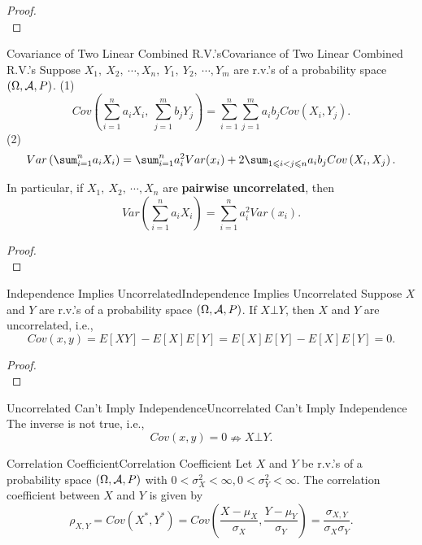 \documentclass{elegantbook}
\begin{document}
\begin{proof}
\\[4cm]\vspace{0.01cm}
\end{proof}

\begin{theorem}{Covariance of Two Linear Combined R.V.'s}{Covariance of Two Linear Combined R.V.'s}
Suppose \(X_{1},\ X_{2},\ \cdots,X_{n},\ Y_{1},\ Y_{2},\ \cdots,Y_{m}\)
are r.v.'s of a probability space $(\Omega,\mathcal{A}, P)$.
(1)
\[Cov\left( \sum_{i = 1}^{n}{a_{i}X_{i}},\ \sum_{j = 1}^{m}{b_{j}Y_{j}} \right) = \sum_{i = 1}^{n}{\sum_{j = 1}^{m}a_{i}b_{j}}Cov\left( X_{i},Y_{j} \right).\]
(2)
\[Var\left( \sum_{i = 1}^{n}{a_{i}X_{i}} \right) = \sum_{i = 1}^{n}{a_{i}^{2}Var(x_{i})} + 2\sum_{1 \ls i < j \ls n}^{}a_{i}b_{j}Cov\left( X_{i},X_{j} \right).\]

In particular, if \(X_{1},\ X_{2},\ \cdots,X_{n}\) are \textbf{pairwise
uncorrelated}, then
\[Var\left( \sum_{i = 1}^{n}{a_{i}X_{i}} \right) = \sum_{i = 1}^{n}{a_{i}^{2}Var(x_{i})}.\]
\end{theorem}

\begin{proof}
\\[4cm]\vspace{0.01cm}
\end{proof}

\begin{theorem}{Independence Implies Uncorrelated}{Independence Implies Uncorrelated}
Suppose \(X\) and \(Y\) are r.v.'s of a probability space $(\Omega,\mathcal{A}, P)$. If \(X\bot Y\), then \(X\) and \(Y\) are uncorrelated, i.e.,
\[Cov(x,y) = E[XY] - E[X] E[Y] = E[X] E[Y] - E[X] E[Y] = 0.\]
\vspace{0.01cm}
\end{theorem}

\begin{proof}
\\[4cm]\vspace{0.01cm}
\end{proof}

\begin{remark}{Uncorrelated Can't Imply Independence}{Uncorrelated Can't Imply Independence}
The inverse is not true, i.e.,
\[Cov(x,y) = 0 \nRightarrow X\bot Y.\]
\vspace{0.01cm}
\end{remark}

\begin{definition}{Correlation Coef\/f\/icient}{Correlation Coefficient}
Let \(X\) and \(Y\) be r.v.'s of a probability space $(\Omega,\mathcal{A}, P)$ with
\(0 < \sigma_{X}^{2} < \infty,0 < \sigma_{Y}^{2} < \infty\). The correlation coef\/f\/icient between \(X\) and \(Y\) is given by
\[\rho_{X,Y} = Cov\left( X^{*},Y^{*} \right) = Cov\left( \frac{X - \mu_{X}}{\sigma_{X}},\frac{Y - \mu_{Y}}{\sigma_{Y}} \right) = \frac{\sigma_{X,Y}}{\sigma_{X}\sigma_{Y}}.\]
\end{definition}
\end{document}
